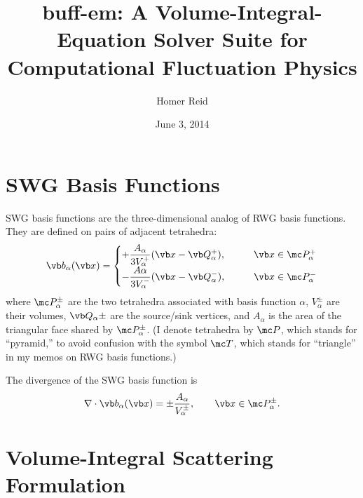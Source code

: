 \documentclass[letterpaper]{article}
\title { {\sc buff-em}: A Volume-Integral-Equation
         Solver Suite for Computational Fluctuation Physics}
\author {Homer Reid}
\date {June 3, 2014}
\begin{document}
\pagestyle{myheadings}
\maketitle

\tableofcontents

\newpage
\section{SWG Basis Functions}

SWG basis functions are the three-dimensional analog of
RWG basis functions. They are defined on pairs of adjacent tetrahedra:
$$ \vb b_\alpha(\vb x) = 
  \begin{cases}
   \displaystyle{
    +\frac{A_\alpha}{3V_\alpha^+}(\vb x - \vb Q_\alpha^+), 
                }
    \qquad &\vb x\in \mc P_\alpha^+
\\[5pt]
   \displaystyle{
  -\frac{A\alpha}{3V_\alpha^-}(\vb x - \vb Q_\alpha^-), 
                } 
    \qquad &\vb x\in \mc P_\alpha^-
  \end{cases}
$$
where $\mc P_\alpha^\pm$ are the two tetrahedra associated with basis
function $\alpha$, $V_\alpha^\pm$ are their volumes, $\vb Q_\alpha\pm$
are the source/sink vertices, and $A_\alpha$ is the area of the 
triangular face shared by $\mc P_\alpha^\pm$. (I denote tetrahedra 
by $\mc P$, which stands for ``pyramid,'' to avoid confusion with
the symbol $\mc T$, which stands for ``triangle'' in my memos on
RWG basis functions.)

The divergence of the SWG basis function is 
$$ \nabla \cdot \vb b_\alpha(\vb x) = 
    \pm \frac{A_\alpha}{V_\alpha^\pm}, \qquad \vb x\in \mc P_\alpha^\pm.
$$

\newpage
\section{Volume-Integral Scattering Formulation}
\end{document}

